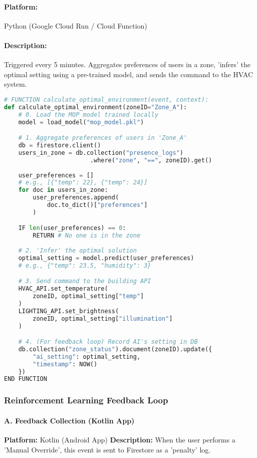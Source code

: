 \documentclass[conference]{IEEEtran}
\begin{document}
\paragraph{Platform:} Python (Google Cloud Run / Cloud Function)
\paragraph{Description:} Triggered every 5 minutes. Aggregates preferences of users in a zone, 'infers' the optimal setting using a pre-trained model, and sends the command to the HVAC system.

\begin{lstlisting}[language=Python]
# FUNCTION calculate_optimal_environment(event, context):
def calculate_optimal_environment(zoneID="Zone_A"):
    # 0. Load the MOP model trained locally
    model = load_model("mop_model.pkl")

    # 1. Aggregate preferences of users in 'Zone_A'
    db = firestore.client()
    users_in_zone = db.collection("presence_logs")
                        .where("zone", "==", zoneID).get()
    
    user_preferences = [] 
    # e.g., [{"temp": 22}, {"temp": 24}]
    for doc in users_in_zone:
        user_preferences.append(
            doc.to_dict()["preferences"]
        )

    IF len(user_preferences) == 0:
        RETURN # No one is in the zone
        
    # 2. 'Infer' the optimal solution
    optimal_setting = model.predict(user_preferences) 
    # e.g., {"temp": 23.5, "humidity": 3}

    # 3. Send command to the building API
    HVAC_API.set_temperature(
        zoneID, optimal_setting["temp"]
    )
    LIGHTING_API.set_brightness(
        zoneID, optimal_setting["illumination"]
    )

    # 4. (For feedback loop) Record AI's setting in DB
    db.collection("zone_status").document(zoneID).update({
        "ai_setting": optimal_setting,
        "timestamp": NOW()
    })
END FUNCTION
\end{lstlisting}


\subsubsection{Reinforcement Learning Feedback Loop}

\paragraph{A. Feedback Collection (Kotlin App)}
\textbf{Platform:} Kotlin (Android App) \newline 
\textbf{Description:} When the user performs a 'Manual Override', this event is sent to Firestore as a 'penalty' log. 
\end{document}
